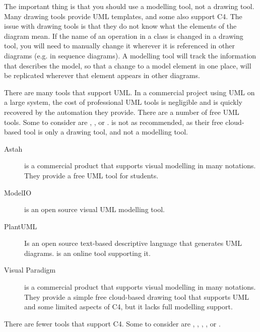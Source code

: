 The important thing is that you should use a modelling tool, not a drawing tool.
Many drawing tools provide UML templates, and some also support C4.
The issue with drawing tools is that they do not know what the elements of the diagram mean.
If the name of an operation in a class is changed in a drawing tool, you will need to manually change it wherever it is referenced in other diagrams
(e.g. in sequence diagrams).
A modelling tool will track the information that describes the model, so that a change to a model element in one place,
will be replicated wherever that element appears in other diagrams.

There are many tools that support UML.
In a commercial project using UML on a large system, the cost of professional UML tools is negligible and is quickly recovered by the automation they provide.
There are a number of free UML tools. Some to consider are ,
, or .
 is not as recommended, as their free cloud-based tool is only a drawing tool, and not a modelling tool.

\begin{description}
    \item[Astah]
        is a commercial product that supports visual modelling in many notations. They provide a free UML tool for students.
    \item[ModelIO] is an open source visual UML modelling tool.
    \item[PlantUML] Is an open source text-based descriptive language that generates UML diagrams.
         is an online tool supporting it.
    \item[Visual Paradigm] is a commercial product that supports visual modelling in many notations.
        They provide a simple free cloud-based drawing tool that supports UML and some limited aspects of C4, but it lacks full modelling support.
\end{description}

\noindent
There are fewer tools that support C4. Some to consider are ,
, ,
, or .

